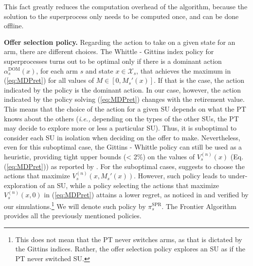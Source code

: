 This fact greatly reduces the computation overhead of the algorithm, because the solution to the superprocess only needs to be computed once, and can be done offline.

\textbf{Offer selection policy.} Regarding the action to take on a given state for an arm, there are different choices.
The Whittle - Gittins index policy for superprocesses turns out to be optimal only if there is a dominant action $\alpha_s^{\text{DOM}}(x)$, for each arm $s$ and state $x \in \mathcal{X}_s$, that achieves the maximum in (\ref{eq:MDPret}) for all values of $M \in [0,M_s'(x)]$. 
If that is the case, the action indicated by the policy is the dominant action. In our case, however, the action indicated by the policy solving (\ref{eq:MDPret}) changes with the retirement value. 
This means that the choice of the action for a given SU depends on what the PT knows about the others (\textit{i.e.,} depending on the types of the other SUs, the PT may decide to explore more or less a particular SU). Thus, it is suboptimal to consider each SU in isolation when deciding on the offer to make.
Nevertheless, even for this suboptimal case, the Gittins - Whittle policy can still be used as a heuristic, providing tight upper bounds (< 2\%) on the values of $V_s^{(n)}(x)$ (Eq. (\ref{eq:MDPret})) as reported by \cite{ref:Brown2013}.
For the suboptimal cases, \cite{ref:Pandey2007} suggests to choose the actions that maximize $V_s^{(n)}(x, M_s'(x))$. However, such policy leads to under-exploration of an SU, while a policy selecting the actions that maximize $V_s^{(n)}(x,0)$ in (\ref{eq:MDPret}) attains a lower regret, as noticed in \cite{ref:Brown2013} and verified by our simulations.\footnote{This does not mean that the PT never switches arms, as that is dictated by the Gittins indices. Rather, the offer selection policy explores an SU as if the PT never switched SU.} We will denote such policy by $\pi_s^{\text{SPR}}$. The Frontier Algorithm provides all the previously mentioned policies. 

